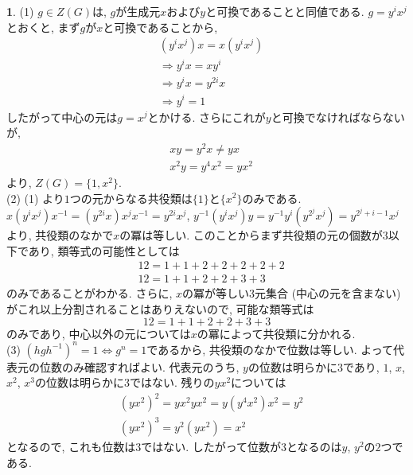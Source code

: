 \documentclass{article}
\theoremstyle{definition}
\newtheorem{ans}{}
\numberwithin{ans}{subsection}
\begin{document}
\begin{ans}
  (1) $g \in Z(G)$は, $g$が生成元$x$および$y$と可換であることと同値である.
  $g = y^ix^j$とおくと, まず$g$が$x$と可換であることから,
  \begin{align*}
    &(y^ix^j)x = x(y^ix^j) \\
    &\Rightarrow y^ix = xy^i \\
    &\Rightarrow y^ix = y^{2i}x \\
    &\Rightarrow y^i = 1
  \end{align*}
  したがって中心の元は$g = x^j$とかける. さらにこれが$y$と可換でなければならないが,
  \begin{align*}
    &xy = y^2x \neq yx \\
    &x^2y = y^4x^2 = yx^2
  \end{align*}
  より, $Z(G) = \{1, x^2\}$.\\
  (2) (1) より$1$つの元からなる共役類は$\{1\}$と$\{x^2\}$のみである.
  $x(y^ix^j)x^{-1} = (y^{2i}x)x^jx^{-1} = y^{2i}x^j$,
  $y^{-1}(y^ix^j)y = y^{-1}y^i(y^{2^j}x^j) = y^{2^j+i-1}x^j$
  より, 共役類のなかで$x$の冪は等しい.
  このことからまず共役類の元の個数が$3$以下であり, 類等式の可能性としては
  \begin{align*}
    &12 = 1 + 1 + 2 + 2 + 2 + 2 + 2 \\
    &12 = 1 + 1 + 2 + 2 + 3 + 3
  \end{align*}
  のみであることがわかる.
  さらに, $x$の冪が等しい$3$元集合 (中心の元を含まない) がこれ以上分割されることはありえないので,
  可能な類等式は
  \[
    12 = 1 + 1 + 2 + 2 + 3 + 3
  \]
  のみであり, 中心以外の元については$x$の冪によって共役類に分かれる.\\
  (3) $(hgh^{-1})^n = 1 \Leftrightarrow g^n = 1$であるから, 共役類のなかで位数は等しい.
  よって代表元の位数のみ確認すればよい.
  代表元のうち, $y$の位数は明らかに$3$であり, $1$, $x$, $x^2$, $x^3$の位数は明らかに$3$ではない.
  残りの$yx^2$については
  \begin{align*}
    &(yx^2)^2 = yx^2yx^2 = y(y^4x^2)x^2 = y^2 \\
    &(yx^2)^3 = y^2(yx^2) = x^2
  \end{align*}
  となるので, これも位数は$3$ではない.
  したがって位数が$3$となるのは$y$, $y^2$の$2$つである.
\end{ans}
\end{document}
